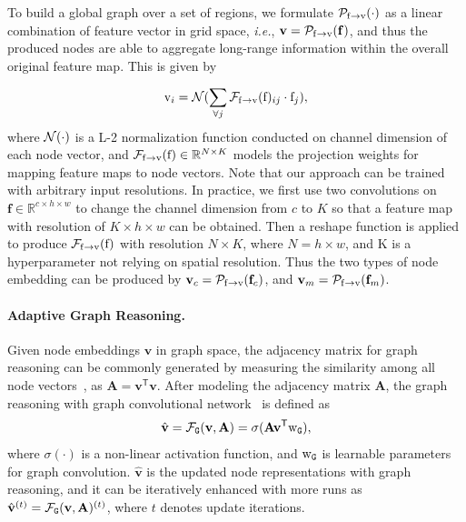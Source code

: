 \documentclass[letterpaper]{article} %
\begin{document}
To build a global graph over a set of regions, we formulate ${\cal P}_{{\mathrm f}\rightarrow {\mathrm v}}(\cdot)$ as a linear combination of feature vector in grid space, {\em i.e.}, ${\mathbf v} = {\cal P}_{{\mathrm f}\rightarrow {\mathrm v}}({\mathbf f})$, and thus the produced nodes are able to aggregate long-range information within the overall original feature map. This is given by

\begin{equation}
	{\mathrm v}_i = {\cal N}(\sum_{\forall j}{\cal F}_{{\mathrm f}\rightarrow {\mathrm v}}({\mathrm f})_{ij} \cdot {\mathrm f}_j),
	\label{eq1}
\end{equation}
where ${\cal N}(\cdot)$ is a L-2 normalization function conducted on channel dimension of each node vector, and ${\cal F}_{{\mathrm f}\rightarrow {\mathrm v}}({\mathrm f}) \in \mathbb{R}^{N \times K}$ models the projection weights for mapping feature maps to node vectors.
Note that our approach can be trained with arbitrary input resolutions. In practice, we first use two convolutions on ${\mathbf f} \in \mathbb{R}^{c \times h \times w}$ to change the channel dimension from $c$ to $K$ so that a feature map with resolution of $K \times h \times w$ can be obtained. Then a reshape function is applied to produce ${\cal F}_{{\mathrm f}\rightarrow {\mathrm v}}({\mathrm f})$ with resolution $N \times K$, where $N = h \times w$, and K is a hyperparameter not relying on spatial resolution. Thus the two types of node embedding can be produced by ${\mathbf v}_c = {\cal P}_{{\mathrm f}\rightarrow {\mathrm v}}({\mathbf f}_c)$, and ${\mathbf v}_m = {\cal P}_{{\mathrm f}\rightarrow {\mathrm v}}({\mathbf f}_m)$.

\paragraph{Adaptive Graph Reasoning.}

Given node embeddings ${\mathbf v}$ in graph space, the adjacency matrix for graph reasoning can be commonly generated by measuring the similarity among all node vectors~\cite{Li2018BeyondGL}, as ${\mathbf A} = {\mathbf v}^{\mathsf T}{\mathbf v}$. After modeling the adjacency matrix ${\mathbf A}$, the graph reasoning with graph convolutional network~\cite{Kipf2017SemiSupervisedCW} is defined as
\begin{equation}
	\hat{\mathbf v} = {\cal F}_{\tt G}({\mathbf v}, {\mathbf A}) = \sigma({\mathbf A} {\mathbf v}^\mathsf{T} {\mathrm w}_{\tt G}),
\end{equation}
where $\sigma(\cdot)$ is a non-linear activation function, and ${\mathrm w}_{\tt G}$ is learnable parameters for graph convolution. $\hat{\mathbf v}$ is the updated node representations with graph reasoning, and it can be iteratively enhanced with more runs as $\hat{\mathbf v}^{(t)} = {\cal F}_{\tt G}({\mathbf v}, {\mathbf A})^{(t)}$, where $t$ denotes update iterations.
\end{document}
